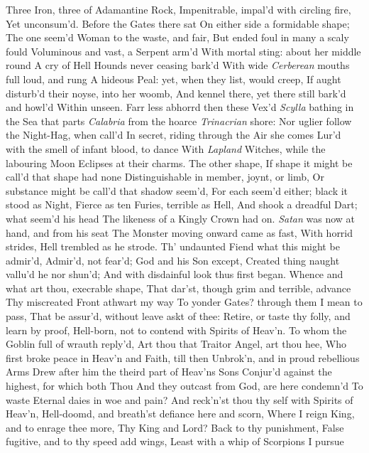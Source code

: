 \documentclass[11pt]{book}
\newcounter {first}
\begin{document}
Three Iron, three of Adamantine Rock, 
Impenitrable, impal'd with circling fire, 
Yet unconsum'd.  Before the Gates there sat 
On either side a formidable shape; 
The one seem'd Woman to the waste, and fair, 
But ended foul in many a scaly fould 
Voluminous and vast, a Serpent arm'd 
With mortal sting: about her middle round 
A cry of Hell Hounds never ceasing bark'd 
With wide \textit{Cerberean} mouths full loud, and rung 
A hideous Peal: yet, when they list, would creep, 
If aught disturb'd their noyse, into her woomb, 
And kennel there, yet there still bark'd and howl'd 
Within unseen.  Farr less abhorrd then these 
Vex'd \textit{Scylla} bathing in the Sea that parts 
\textit{Calabria} from the hoarce \textit{Trinacrian} shore: 
Nor uglier follow the Night-Hag, when call'd 
In secret, riding through the Air she comes 
Lur'd with the smell of infant blood, to dance 
With \textit{Lapland} Witches, while the labouring Moon 
Eclipses at their charms.  The other shape, 
If shape it might be call'd that shape had none 
Distinguishable in member, joynt, or limb, 
Or substance might be call'd that shadow seem'd, 
For each seem'd either; black it stood as Night, 
Fierce as ten Furies, terrible as Hell, 
And shook a dreadful Dart; what seem'd his head 
The likeness of a Kingly Crown had on. 
\textit{Satan} was now at hand, and from his seat 
The Monster moving onward came as fast, 
With horrid strides, Hell trembled as he strode. 
Th' undaunted Fiend what this might be admir'd, 
Admir'd, not fear'd; God and his Son except, 
Created thing naught vallu'd he nor shun'd; 
And with disdainful look thus first began. 
\quad Whence and what art thou, execrable shape, 
That dar'st, though grim and terrible, advance 
Thy miscreated Front athwart my way 
To yonder Gates? through them I mean to pass, 
That be assur'd, without leave askt of thee: 
Retire, or taste thy folly, and learn by proof, 
Hell-born, not to contend with Spirits of Heav'n. 
\quad To whom the Goblin full of wrauth reply'd, 
Art thou that Traitor Angel, art thou hee, 
Who first broke peace in Heav'n and Faith, till then 
Unbrok'n, and in proud rebellious Arms 
Drew after him the theird part of Heav'ns Sons 
Conjur'd against the highest, for which both Thou 
And they outcast from God, are here condemn'd 
To waste Eternal daies in woe and pain? 
And reck'n'st thou thy self with Spirits of Heav'n, 
Hell-doomd, and breath'st defiance here and scorn, 
Where I reign King, and to enrage thee more, 
Thy King and Lord?  Back to thy punishment, 
False fugitive, and to thy speed add wings, 
Least with a whip of Scorpions I pursue 
\end{document}
